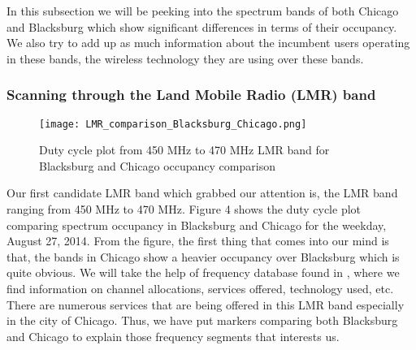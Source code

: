 \documentclass[12pt,sts]{report}
\begin{document}
	In this subsection we will be peeking into the spectrum bands of both Chicago and Blacksburg which show significant differences in terms of their occupancy. We also try to add up as much information about the incumbent users operating in these bands, the wireless technology they are using over these bands.
	
		\subsubsection{Scanning through the Land Mobile Radio (LMR) band}
		
		\begin{figure}[ht!]
			\centering
				\texttt{[image: LMR\_comparison\_Blacksburg\_Chicago.png]}
			\caption{Duty cycle plot from 450 MHz to 470 MHz LMR band for Blacksburg and Chicago occupancy comparison}
		\end{figure}
		
		Our first candidate LMR band which grabbed our attention is, the LMR band ranging from 450 MHz to 470 MHz. Figure 4 shows the duty cycle plot comparing spectrum occupancy in Blacksburg and Chicago for the weekday, August 27, 2014. From the figure, the first thing that comes into our mind is that, the bands in Chicago show a heavier occupancy over Blacksburg which is quite obvious. We will take the help of frequency database found in \cite{chicago_spec_occ} \cite{blacksburg_spec_occ}, where we find information on channel allocations, services offered, technology used, etc. There are numerous services that are being offered in this LMR band especially in the city of Chicago. Thus, we have put markers comparing both Blacksburg and Chicago to explain those frequency segments that interests us.
		
\end{document}
